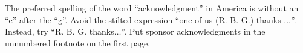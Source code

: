 \documentclass[conference]{IEEEtran}
\begin{document}
	The preferred spelling of the word ``acknowledgment'' in America is without 
	an ``e'' after the ``g''. Avoid the stilted expression ``one of us (R. B. 
	G.) thanks $\ldots$''. Instead, try ``R. B. G. thanks$\ldots$''. Put sponsor 
	acknowledgments in the unnumbered footnote on the first page.
	
	
%	
%	
%	
	
\end{document}
